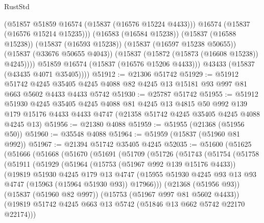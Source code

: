 \begin{lexlean}{RustStd}
\begin{coremodule}
                (@51857 @51859 @16574 (@15837 (@16576 @15224 @4433)))
                @16574
                (@15837 (@16576 @15214 @15235)))
              (@16583 (@16584 @15238))
              (@15837 (@16588 @15238))
              (@15837 (@16593 @15238))
              (@15837 (@16597 @15238 @50655))
              (@15837 (@33676 @50655 @4043))
              (@15837 (@15872 (@15873 (@16608 @15238)) @4245))))
          @51859
          @16574
          (@15837 (@16576 @15206 @4433)))
        @43433
        (@15837 (@43435 @4071 @35405))))
@51912 := @21306 @51742
@51929 := @51912
    @51742
    @4245
    @35405
    @4245
    @4088
    @82
    @4245
    @13
    @15181
    @93
    @997
    @81
    @663
    @5602
    @4433
    @4433
    @5742
@51930 := @25787 @51742
@51955 := @51912
    @51930
    @4245
    @35405
    @4245
    @4088
    @81
    @4245
    @13
    @4815
    @50
    @992
    @139
    @179
    @15176
    @4433
    @4433
    @4747
    (@21358 @51742 @4245 @35405 @4245 @4088 @4245 @13)
@51956 := @21380 @4088
@51959 := @51955 (@21368 (@51956 @50))
@51960 := @35548 @4088
@51964 := @51959 (@15837 (@51960 @81 @992))
@51967 := @21394 @51742 @35405 @4245
@52035 := @51600
    (@51625
      (@51666
        (@51668
          (@51670
            (@51691
              (@51709
                (@51726
                  (@51743
                    (@51754
                      (@51758
                        (@51911
                          (@51929
                            (@51964
                              (@15753 (@51967 @992 @139 @15176 @4433))
                              (@19819
                                @51930
                                @4245
                                @179
                                @13
                                @4747
                                (@15955
                                  @51930
                                  @4245
                                  @93
                                  @13
                                  @93
                                  @4747
                                  (@15963 (@15964 @51930 @93))
                                  @17966)))
                            (@21368 (@51956 @93))
                            (@15837 (@51960 @82 @997))
                            (@15753 (@51967 @997 @81 @5602 @4433))
                            (@19819
                              @51742
                              @4245
                              @663
                              @13
                              @5742
                              (@51846 @13 @662 @5742 @22170 @22174)))

\end{coremodule}
\end{lexlean}

